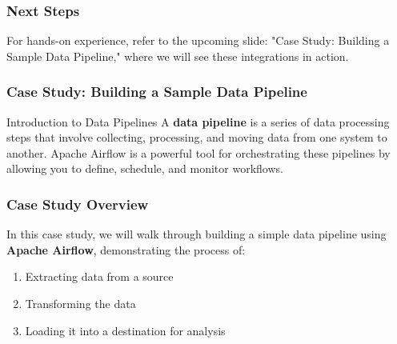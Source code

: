 \documentclass[aspectratio=169]{beamer}
\begin{document}
\begin{frame}
    \frametitle{Next Steps}
    For hands-on experience, refer to the upcoming slide: "Case Study: Building a Sample Data Pipeline," where we will see these integrations in action.
\end{frame}

\begin{frame}
    \frametitle{Case Study: Building a Sample Data Pipeline}
    \begin{block}{Introduction to Data Pipelines}
        A \textbf{data pipeline} is a series of data processing steps that involve collecting, processing, and moving data from one system to another. 
        Apache Airflow is a powerful tool for orchestrating these pipelines by allowing you to define, schedule, and monitor workflows.
    \end{block}
\end{frame}

\begin{frame}
    \frametitle{Case Study Overview}
    In this case study, we will walk through building a simple data pipeline using \textbf{Apache Airflow}, demonstrating the process of:
    \begin{enumerate}
        \item Extracting data from a source
        \item Transforming the data
        \item Loading it into a destination for analysis
    \end{enumerate}
\end{frame}
\end{document}
